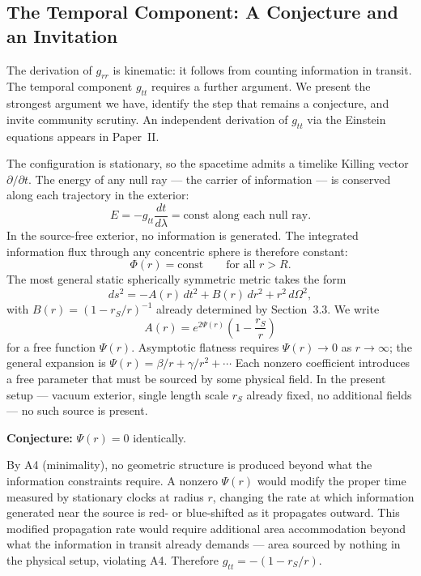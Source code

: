 \documentclass[12pt]{article}
\begin{document}
\subsection{The Temporal Component: A Conjecture and an Invitation}
\label{sec:gtt}

The derivation of $g_{rr}$ is kinematic: it follows from counting
information in transit.
The temporal component $g_{tt}$ requires a further argument.
We present the strongest argument we have, identify the step that
remains a conjecture, and invite community scrutiny.
An independent derivation of $g_{tt}$ via the Einstein equations
appears in Paper~II.

The configuration is stationary, so the spacetime admits a timelike
Killing vector $\partial/\partial t$.
The energy of any null ray --- the carrier of information --- is
conserved along each trajectory in the exterior:
\begin{equation}
  E = -g_{tt}\frac{dt}{d\lambda} = \text{const along each null ray.}
  \label{eq:killing-energy}
\end{equation}
In the source-free exterior, no information is generated.
The integrated information flux through any concentric sphere is
therefore constant:
\begin{equation}
  \Phi(r) = \text{const} \qquad \text{for all } r > R.
  \label{eq:flux-conservation}
\end{equation}
The most general static spherically symmetric metric takes the form
\cite{Wald1984}
\begin{equation}
  ds^2 = -A(r)\,dt^2 + B(r)\,dr^2 + r^2\,d\Omega^2,
  \label{eq:metric-general}
\end{equation}
with $B(r) = (1 - r_S/r)^{-1}$ already determined by Section~3.3.
We write
\begin{equation}
  A(r) = e^{2\Psi(r)}\left(1 - \frac{r_S}{r}\right)
  \label{eq:Ar}
\end{equation}
for a free function $\Psi(r)$.
Asymptotic flatness requires $\Psi(r) \to 0$ as $r \to \infty$;
the general expansion is $\Psi(r) = \beta/r + \gamma/r^2 + \cdots$
Each nonzero coefficient introduces a free parameter that must be
sourced by some physical field.
In the present setup --- vacuum exterior, single length scale $r_S$
already fixed, no additional fields --- no such source is present.

\medskip
\noindent\textbf{Conjecture:} $\Psi(r) = 0$ identically.

\medskip
By A4 (minimality), no geometric structure is produced beyond what
the information constraints require.
A nonzero $\Psi(r)$ would modify the proper time measured by stationary
clocks at radius $r$, changing the rate at which information generated
near the source is red- or blue-shifted as it propagates outward.
This modified propagation rate would require additional area
accommodation beyond what the information in transit already demands ---
area sourced by nothing in the physical setup, violating A4.
Therefore $g_{tt} = -(1 - r_S/r)$.
\end{document}
